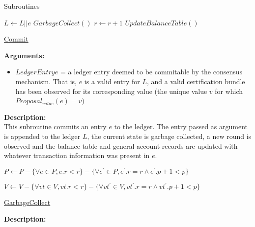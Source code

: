 \documentclass[10pt,a4paper]{article}
\begin{document}
\begin{section}{Subroutines}
\begin{algorithm}[H]
\begin{algorithmic}[1]
        \State $L \gets L || e$
        \State $GarbageCollect()$
        \State $r \gets r+1$
        \State $UpdateBalanceTable()$

    \EndFunction
    \end{algorithmic}
    \caption{\underline{Commit}}
\end{algorithm}

\noindent \textbf{Arguments:}
\begin{itemize}
    \item $LedgerEntry e$ = a ledger entry deemed to be commitable by the consensus mechanism.
    That is, $e$ is a valid entry for $L$, and a valid certification bundle has been observed for 
    its corresponding value (the unique value $v$ for which $Proposal_{value}(e) = v$)
\end{itemize}

\noindent \textbf{Description:}\\
This subroutine commits an entry $e$ to the ledger. The entry passed as argument is appended to the ledger $L$,
the current state is garbage collected, a new round is observed and the balance table and general
account records are updated with whatever transaction information was present in $e$.


\begin{algorithm}[H]
    \begin{algorithmic}[1]


    \State $P \gets P - \{\forall e \in P, e.r < r\} - 
        \{\forall e^\prime \in P, e^\prime.r = r \land e^\prime.p + 1 < p\}$

    \State $V \gets V - \{\forall vt \in V, vt.r < r\} - 
        \{\forall vt^\prime \in V, vt^\prime.r = r \land vt^\prime.p + 1 < p\}$

    \EndFunction
    \end{algorithmic}
    \caption{\underline{GarbageCollect}}
\end{algorithm}

\noindent \textbf{Description:}\\




\end{section}
\end{document}
